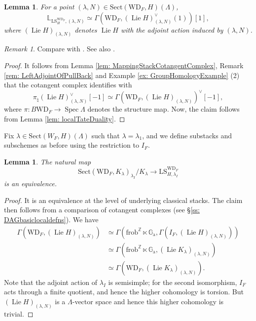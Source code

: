 \documentclass{amsart}
\newtheorem{lemma}[theorem]{Lemma}
\theoremstyle{definition}
\theoremstyle{remark}
\newtheorem{remark}[theorem]{Remark}
\numberwithin{equation}{section}
\DeclareMathOperator{\Lie}{Lie}
\DeclareMathOperator{\Spec}{Spec}
\newcommand{\bb}{\mathbb}
\newcommand{\Z}{\mathbb{Z}}
\newcommand{\frob}{\mathrm{frob}}
\newcommand{\WD}{\mathrm{WD}}
\newcommand{\Ga}{\mathbb{G}_{\mathrm{a}}}
\newcommand{\LS}{\mathrm{LS}}
\newcommand{\Sect}{\mathrm{Sect}}
\begin{document}
\begin{lemma}
For a point $(\lambda, N)\in \Sect(\WD_F, H)(\Lambda)$, 
\[
\bb L_{\LS^{\WD_F}_H, (\lambda, N)} \simeq
\Gamma (\WD_F, (\Lie H)_{(\lambda, N)}^{\vee}(1))[1], 
\]
where $(\Lie H)_{(\lambda, N)}$ denotes $\Lie H$ with the adjoint action induced by $(\lambda, N)$. 
\end{lemma}

\begin{remark}
Compare with \cite[Proposition 2.15, Remark 2.16]{Zhu}. See also \cite[Proposition 4.10]{takayalin}. 
\end{remark}

\begin{proof}
It follows from Lemma \ref{lem: MappingStackCotangentComplex}, Remark \ref{rem: LeftAdjointOfPullBack} and Example \ref{ex: GroupHomologyExample} (2) that the cotangent complex identifies with
\[
\pi_\natural (\Lie H)_{(\lambda, N)}^{\vee}[-1]
\simeq
\Gamma (\WD_F, (\Lie H)_{(\lambda, N)})^{\vee}[-1], 
\]
where $\pi\colon B\WD_F\to \Spec \Lambda$ denotes the structure map. Now, the claim follows from Lemma \ref{lem: localTateDuality}.
\end{proof}

Fix $\lambda\in \Sect(W_F, H)(\Lambda)$ such that $\lambda=\lambda_1$, and we define substacks and subschemes as before using the restriction to $I_F$. 

\begin{lemma}
The natural map
\[
\Sect (\WD_F, K_\lambda)_{\lambda_I} /K_\lambda\rightarrow \LS_{H, \lambda_I}^{\WD_F}   
\]
is an equivalence. 
\end{lemma}

\begin{proof}
It is an equivalence at the level of underlying classical stacks. The claim then follows from a comparison of cotangent complexes (see \S\ref{ss: DAGbasiclocaldefns}). 
We have
\begin{align*}
\Gamma (\WD_F, (\Lie H)_{(\lambda, N)})
&\simeq
\Gamma( \frob^\Z\ltimes \Ga, \Gamma (I_F, (\Lie H)_{(\lambda, N)})) \\
&\simeq 
\Gamma( \frob^\Z\ltimes \Ga, (\Lie K_{\lambda})_{(\lambda, N)})\\
& \simeq \Gamma(\WD_F, (\Lie K_{\lambda})_{(\lambda, N)}).
\end{align*} 
Note that the adjoint action of $\lambda_I$ is semisimple; for the second isomorphism, $I_F$ acts through a finite quotient, and hence the higher cohomology is torsion. But $(\Lie H)_{(\lambda, N)}$ is a $\Lambda$-vector space and hence this higher cohomology is trivial.
\end{proof}
\end{document}
